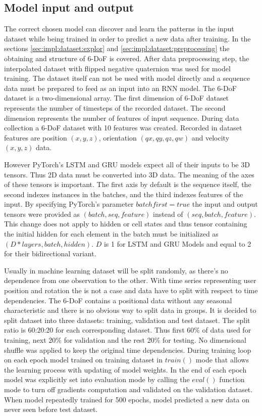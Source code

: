 \subsection{Model input and output}
\label{sec:impl:model:inputs}
The correct chosen model can discover and learn the patterns in the input dataset while being trained in order to predict a new data after training. In the sections \ref{sec:impl:dataset:explor} and \ref{sec:impl:dataset:preprocessing} the obtaining and structure of 6-DoF is covered. After data preprocessing step, the interpolated dataset with flipped negative quaternion was used for model training. The dataset itself can not be used with model directly and a sequence data must be prepared to feed as an input into an RNN model. The 6-DoF dataset is a two-dimensional array. The first dimension of 6-DoF dataset represents the number of timesteps of the recorded dataset. The second dimension represents the number of features of input sequence. During data collection a 6-DoF dataset with 10 features was created. Recorded in dataset features are position $(x, y, z)$, orientation $(qx, qy, qz, qw)$ and velocity $(x, y, z)$ data. 

However PyTorch’s LSTM and GRU models expect all of their inputs to be 3D tensors. Thus 2D data must be converted into 3D data. The meaning of the axes of these tensors is important. The first axis by default is the sequence itself, the second indexes instances in the batches, and the third indexes features of the input. By specifying PyTorch's parameter $batch first = true$ the input and output tensors were provided as $(batch, seq, feature)$ instead of $(seq, batch, feature)$. This change does not apply to hidden or cell states and thus tensor containing the initial hidden for each element in the batch must be initialized as $(D * layers, batch, hidden)$. $D$ is 1 for LSTM and GRU Models and equal to 2 for their bidirectional variant. 

Usually in machine learning dataset will be split randomly, as there’s no dependence from one observation to the other. With time series representing user position and rotation the is not a case and data have to split with respect to time dependencies. The 6-DoF contains a positional data without any seasonal characteristic and there is no obvious way to split data in groups. It is decided to split dataset into three datasets: training, validation and test dataset. The split ratio is 60:20:20 for each corresponding dataset. Thus first 60\% of data used for training, next 20\% for validation and the rest 20\% for testing. No dimensional shuffle was applied to keep the original time dependencies. During training loop on each epoch model trained on training dataset in $train()$ mode that allows the learning process with updating of model weights. In the end of each epoch model was explicitly set into evaluation mode by calling the $eval()$ function mode to turn off gradients computation and validated on the validation dataset. When model repeatedly trained for 500 epochs, model predicted a new data on never seen before test dataset. 

